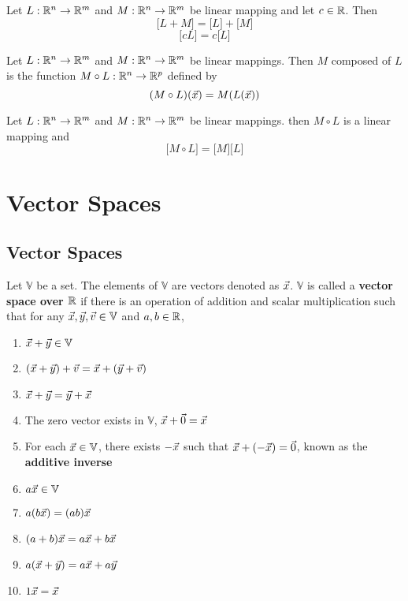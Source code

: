 \documentclass[english, 12pt]{article}
\begin{document}
\begin{thrm}
Let $L: {\mathbb{R}}^n \rightarrow {\mathbb{R}}^m$ and $M: {\mathbb{R}}^n \rightarrow {\mathbb{R}}^m$ be linear mapping and let $c \in {\mathbb{R}}$. Then
\[\lbrack L + M \rbrack = \lbrack L \rbrack + \lbrack M \rbrack\]
\[\lbrack cL \rbrack = c \lbrack L \rbrack\]
\end{thrm}

\begin{defn}
Let $L:{\mathbb{R}}^n \rightarrow {\mathbb{R}}^m$ and $M:{\mathbb{R}}^n \rightarrow {\mathbb{R}}^m$ be linear mappings. Then $M$ composed of $L$ is the function $M \circ L: {\mathbb{R}}^n \rightarrow {\mathbb{R}}^p$ defined by
\[(M \circ L)(\vec{x}) = M(L(\vec{x}))\]
\end{defn}

\begin{thrm}
Let $L: {\mathbb{R}}^n \rightarrow {\mathbb{R}}^m$ and $M: {\mathbb{R}}^n \rightarrow {\mathbb{R}}^m$ be linear mappings. then $M \circ L$ is a linear mapping and
\[\lbrack M \circ L \rbrack = \lbrack M \rbrack \lbrack L \rbrack\]
\end{thrm}

\section{Vector Spaces}

\subsection{Vector Spaces}

\begin{defn}
Let $\mathbb{V}$ be a set. The elements of $\mathbb{V}$ are vectors denoted as $\vec{x}$. $\mathbb{V}$ is called a \textbf{vector space over ${\mathbb{R}}$} if there is an operation of addition and scalar multiplication such that for any $\vec{x},\vec{y},\vec{v} \in \mathbb{V}$ and $a,b \in {\mathbb{R}}$,
\begin{enumerate}
\item $\vec{x} + \vec{y} \in \mathbb{V}$
\item $(\vec{x} + \vec{y}) + \vec{v} = \vec{x} + (\vec{y} + \vec{v})$
\item $\vec{x} + \vec{y} = \vec{y} + \vec{x}$
\item The zero vector exists in $\mathbb{V}$, $\vec{x} + \vec{0} = \vec{x}$
\item For each $\vec{x} \in \mathbb{V}$, there exists $-\vec{x}$ such that $\vec{x} + (- \vec{x}) = \vec{0}$, known as the \textbf{additive inverse}
\item $a\vec{x} \in \mathbb{V}$
\item $a (b\vec{x}) = (ab)\vec{x}$
\item $(a+b)\vec{x} = a\vec{x} + b\vec{x}$
\item $a(\vec{x} + \vec{y}) = a\vec{x} + a\vec{y}$
\item $1\vec{x} = \vec{x}$
\end{enumerate}
\end{defn}
\end{document}
